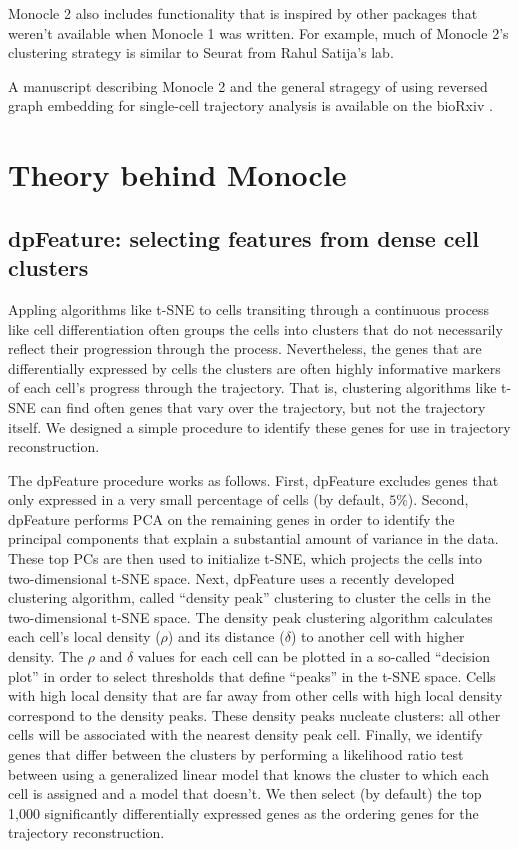 \documentclass[10pt,oneside]{article}\usepackage[]{graphicx}\usepackage[]{color}
\begin{document}
Monocle 2 also includes functionality that is inspired by other packages that weren't available when Monocle 1 was written. For example, much of Monocle 2's clustering strategy is similar to
Seurat \cite{Satija2015-xb} from Rahul Satija's lab.  

A manuscript describing Monocle 2 and the general stragegy of using reversed 
graph embedding for single-cell trajectory analysis is available on the bioRxiv \cite{Qiu2017-nx}. 
 
\section{Theory behind Monocle}\label{theory}
\subsection{dpFeature: selecting features from dense cell clusters}
Appling algorithms like t-SNE to cells transiting through a continuous process like cell differentiation often groups the cells into clusters that do not necessarily reflect their progression through the process. Nevertheless, the genes that are differentially expressed by cells the clusters are often highly informative markers of each cell's progress through the trajectory. That is, clustering algorithms like t-SNE can find often genes that vary over the trajectory, but not the trajectory itself. We designed a simple procedure to identify these genes for use in trajectory reconstruction. 
	
The dpFeature procedure works as follows. First, dpFeature excludes genes that only expressed in a very small percentage of cells (by default, $5\%$). Second, dpFeature performs PCA on the remaining genes in order to identify the principal components that explain a substantial amount of variance in the data. These top PCs are then used to initialize t-SNE, which projects the cells into two-dimensional t-SNE space. Next, dpFeature uses a recently developed clustering algorithm, called ``density peak'' clustering \cite{Rodriguez2014-rl} to cluster the cells in the two-dimensional t-SNE space. The density peak clustering algorithm calculates each cell's local density ($\rho$) and its distance ($\delta$) to another cell with higher density. The $\rho$ and $\delta$ values for each cell can be plotted in a so-called ``decision plot'' in order to select thresholds that define ``peaks'' in the t-SNE space. Cells with high local density that are far away from other cells with high local density correspond to the density peaks. These density peaks nucleate clusters: all other cells will be associated with the nearest density peak cell. Finally, we identify genes that differ between the clusters by performing a likelihood ratio test between using a generalized linear model that knows the cluster to which each cell is assigned and a model that doesn't. We then select (by default) the top 1,000 significantly differentially expressed genes as the ordering genes for the trajectory reconstruction. 
	
\end{document}
